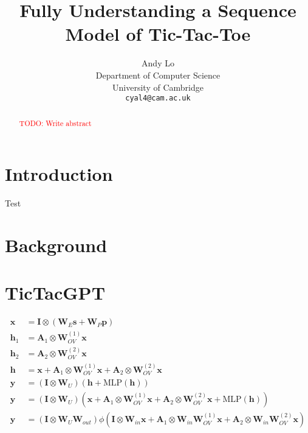 \documentclass{article}
\title{Fully Understanding a Sequence Model of Tic-Tac-Toe}
\author{%
  Andy Lo \\
  Department of Computer Science\\
  University of Cambridge\\
  \texttt{cyal4@cam.ac.uk} \\
}
\newcommand{\todo}[1]{\textcolor{red}{TODO: #1}}
\newcommand{\ttgpt}{TicTacGPT\xspace}
\renewcommand{\v}[1]{\mathbf{\bm{#1}}}
\newcommand{\m}[1]{\mathbf{\bm{#1}}}
\newcommand{\I}{\m{I}}
\begin{document}
\maketitle


\begin{abstract}
    \todo{Write abstract}
\end{abstract}


\section{Introduction}

Test \cite{orthello-gpt,linear-orthello-gpt}

\section{Background}

\section{\ttgpt}


\begin{equation}
    \begin{aligned}
        \v{x}   & = \I \otimes (\m{W}_E \v{s} + \m{W}_P \v{p})       \\
        \v{h}_1 & = \m{A}_1 \otimes \m{W}^{(1)}_{OV} \v{x}           \\
        \v{h}_2 & = \m{A}_2 \otimes \m{W}^{(2)}_{OV} \v{x}           \\
        \v{h}   & = \v{x}
        + \m{A}_1 \otimes \m{W}^{(1)}_{OV} \v{x}
        + \m{A}_2 \otimes \m{W}^{(2)}_{OV} \v{x}                     \\
        \v{y}   & = (\I \otimes \m{W}_U) (\v{h} + \text{MLP}(\v{h})) \\
        \v{y}   & = (\I \otimes \m{W}_U) (
        \v{x}
        + \m{A}_1 \otimes \m{W}^{(1)}_{OV} \v{x}
        + \m{A}_2 \otimes \m{W}^{(2)}_{OV} \v{x}
        + \text{MLP}(\v{h})
        )                                                            \\
        \v{y}   & = (\I \otimes \m{W}_U \m{W}_{out})
        \phi(\I \otimes \m{W}_{in} \v{x}
        + \m{A}_1 \otimes \m{W}_{in} \m{W}^{(1)}_{OV} \v{x}
        + \m{A}_2 \otimes \m{W}_{in} \m{W}^{(2)}_{OV} \v{x}
        )
    \end{aligned}
\end{equation}


\end{document}
